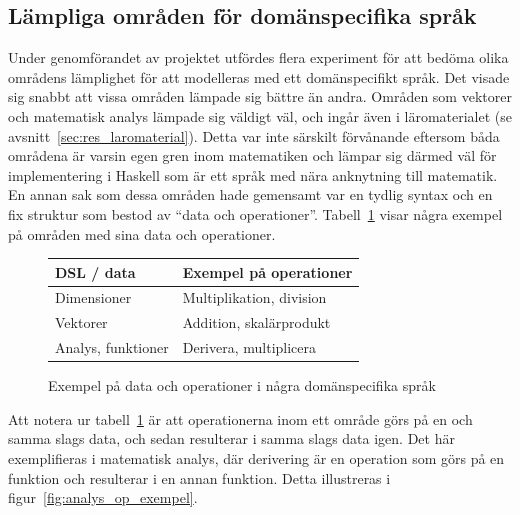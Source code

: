 \subsection{Lämpliga områden för domänspecifika språk}\label{sec:lampligt}

Under genomförandet av projektet utfördes flera experiment för att bedöma olika
områdens lämplighet för att modelleras med ett domänspecifikt språk. Det visade
sig snabbt att vissa områden lämpade sig bättre än andra. Områden
som vektorer och matematisk analys lämpade sig väldigt väl, och ingår även i
läromaterialet (se avsnitt~\ref{sec:res_laromaterial}). Detta var inte särskilt
förvånande eftersom båda områdena är varsin egen gren inom matematiken
och lämpar sig därmed väl för implementering i Haskell som är ett språk med nära
anknytning till matematik. En annan sak som dessa områden hade
gemensamt var en tydlig syntax och en fix struktur som bestod av ``data och
operationer''. Tabell~\ref{tab:data_och_ops} visar några exempel på områden med
sina data och operationer.

\captionsetup[figure]{name=Tabell}

\begin{figure}[tph]
\centering
\caption{Exempel på data och operationer i några domänspecifika språk}\label{tab:data_och_ops}
\begin{tabular}{l|l}
\toprule
DSL / data & Exempel på operationer \\ \midrule
Dimensioner & Multiplikation, division \\
Vektorer & Addition, skalärprodukt \\
Analys, funktioner & Derivera, multiplicera \\ \bottomrule
\end{tabular}
\end{figure}

\captionsetup[figure]{name=Figur}

Att notera ur tabell~\ref{tab:data_och_ops} är att operationerna inom ett område
görs på en och samma slags data, och sedan resulterar i samma slags data igen.
Det här exemplifieras i matematisk analys, där derivering är en operation som
görs på en funktion och resulterar i en annan funktion. Detta illustreras
i figur~\ref{fig:analys_op_exempel}.

